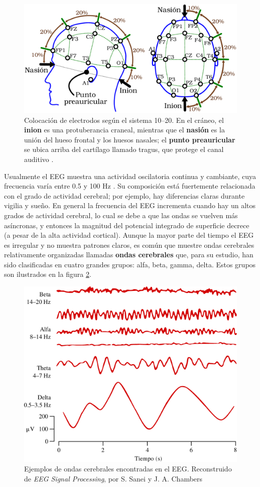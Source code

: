 \begin{figure}
\centering
\includegraphics[width=0.9\linewidth]{./img_diagramas/cabeza_hecha.pdf} 
\caption{Colocaci\'on de electrodos seg\'un el sistema 10--20. En el cr\'aneo, el \textbf{inion} es 
una protuberancia craneal, mientras que el \textbf{nasi\'on} es la uni\'on del hueso frontal y los 
huesos nasales; el \textbf{punto preauricular} se ubica arriba del cart\'ilago llamado tragus, que 
protege el canal auditivo \cite{Butkov07}. 
}
\label{img1020}
\end{figure}

Usualmente el EEG muestra una actividad oscilatoria continua y cambiante, cuya 
frecuencia var\'ia entre 0.5 y 100 Hz \cite{Clark98}.
Su composici\'on est\'a fuertemente relacionada con el grado de actividad 
cerebral; por ejemplo, hay diferencias claras durante vigilia y sue\~no.
En general la frecuencia del EEG incrementa cuando hay un altos grados de actividad cerebral, lo 
cual se debe a que las ondas se vuelven m\'as as\'incronas, y entonces la magnitud del  potencial 
integrado de superficie decrece (a pesar de la alta actividad cortical).
Aunque la mayor parte del tiempo el EEG es irregular y no muestra patrones claros, es com\'un que 
muestre ondas cerebrales relativamente organizadas llamadas \textbf{ondas cerebrales} que, 
para su estudio, han sido clasificadas en 
cuatro grandes grupos: alfa, beta, gamma, delta.
Estos grupos son ilustrados en la figura \ref{ritmos}.

\begin{figure}
\centering
\includegraphics[width=0.55\linewidth]{./img_diagramas/ritmos_hechos.pdf} 
\caption{Ejemplos de ondas cerebrales encontradas en el EEG. Reconstruido de \textit{EEG Signal 
Processing}, por S. Sanei y J. A. Chambers \cite{Sanei07} }
\label{ritmos}
\end{figure}

